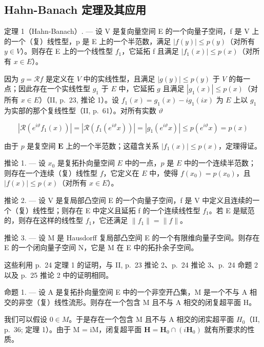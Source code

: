 \subsection{Hahn-Banach 定理及其应用}

定理 1（Hahn-Banach）. --- 设 V 是复向量空间 E 的一个向量子空间，f 是 V 上的一个（复）线性型，p 是 E 上的一个半范数，满足 \(|f(y)| \leqslant p(y)\)（对所有 \(y \in V\)）。则存在 E 上的一个线性型 \(f_{1}\)，它延拓 f 且满足 \(|f_{1}(x)| \leqslant p(x)\)（对所有 \(x \in E\)）。

因为 \(g = \mathcal{R}f\) 是定义在 \(V\) 中的实线性型，且满足 \(|g(y)| \leqslant p(y)\) 于 \(V\) 的每一点；因此存在一个实线性型 \(g_1\) 于 \(E\) 中，它延拓 \(g\) 且满足 \(|g_1(x)| \leqslant p(x)\)（对所有 \(x \in E\)）（II, p.~23, 推论 1）。设 \(f_1(x) = g_1(x) - ig_1(ix)\) 为 \(E\) 上以 \(g_1\) 为实部的那个复线性型（II, p.~61）。对所有实数 \(\vartheta\)

\[
\left| \mathcal {R} (e ^ {i \vartheta} f _ {1} (x)) \right| = \left| \mathcal {R} (f _ {1} (e ^ {i \vartheta} x)) \right| = \left| g _ {1} (e ^ {i \vartheta} x) \right| \leqslant p (e ^ {i \vartheta} x) = p (x)
\]

由于 \(p\) 是复空间 \(\mathbf{E}\) 上的一个半范数；这蕴含关系 \(|f_1(x)| \leqslant p(x)\)，定理得证。

推论 1. --- 设 \(x_0\) 是复拓扑向量空间 \(E\) 中的一点，\(p\) 是 \(E\) 中的一个连续半范数；则存在一个连续（复）线性型 \(f\)，它定义在 \(E\) 中，使得 \(f(x_0) = p(x_0)\)，且 \(|f(x)| \leqslant p(x)\)（对所有 \(x \in E\)）。

推论 2. --- 设 V 是复局部凸空间 E 的一个向量子空间，f 是 V 中定义且连续的一个（复）线性型；则存在 E 中定义且延拓 f 的一个连续线性型 \(f_{1}\)。若 E 是赋范的，则存在这样的线性型 \(f_{1}\)，它还满足 \(\|f_{1}\|=\|f\|\)。

推论 3. --- 设 M 是 Hausdorff 复局部凸空间 E 的一个有限维向量子空间。则存在 E 的一个闭向量子空间 N，它是 M 在 E 中的拓扑余子空间。

这些利用 p.~24 定理 1 的证明，与 II, p.~23 推论 2、p.~24 推论 3、p.~24 命题 2 以及 p.~25 推论 2 中的证明相同。

命题 1. --- 设 A 是复拓扑向量空间 E 中的一个非空开凸集，M 是一个不与 A 相交的非空（复）线性流形。则存在一个包含 M 且不与 A 相交的闭复超平面 H。

我们可以假设 \(0 \in M\)。于是存在一个包含 M 且不与 A 相交的闭实超平面 \(H_{0}\)（II, p.~36; 定理 1）。由于 M = iM，闭复超平面 \(\mathbf{H} = \mathbf{H}_{0} \cap (i\mathbf{H}_{0})\) 就有所要求的性质。

